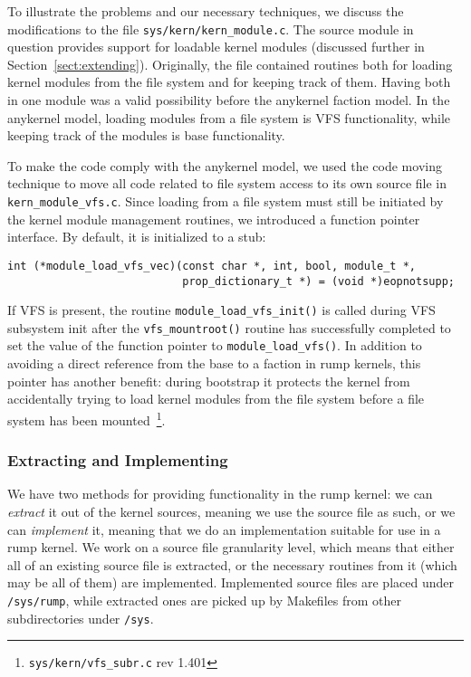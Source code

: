 To illustrate the problems and our necessary techniques, we discuss
the modifications to the file \verb+sys/kern/kern_module.c+.  The
source module in question provides support for loadable kernel
modules (discussed further in Section~\ref{sect:extending}).
Originally, the file contained routines both for loading kernel
modules from the file system and for keeping track of them.  Having
both in one module was a valid possibility before the anykernel faction
model.  In the anykernel model, loading modules from a file system is VFS
functionality, while keeping track of the modules is base functionality.

To make the code comply with the anykernel model, we used the code
moving technique to move all code related to file system access to
its own source file in \verb+kern_module_vfs.c+.  Since loading from
a file system must still be initiated by the kernel module management
routines, we introduced a function pointer interface.  By default,
it is initialized to a stub:

{\small
\begin{verbatim}
int (*module_load_vfs_vec)(const char *, int, bool, module_t *,
                           prop_dictionary_t *) = (void *)eopnotsupp; 
\end{verbatim}}

If VFS is present, the routine \verb+module_load_vfs_init()+ is
called during VFS subsystem init after the \verb+vfs_mountroot()+
routine has successfully completed to set the value of the function
pointer to \verb+module_load_vfs()+.  In addition to avoiding a
direct reference from the base to a faction in rump kernels, this
pointer has another benefit: during bootstrap it protects the kernel from
accidentally trying to load kernel modules from the file system before
a file system has been mounted~\footnote{\texttt{sys/kern/vfs\_subr.c}
rev 1.401}.

\subsubsection{Extracting and Implementing}

We have two methods for providing functionality in the rump kernel:
we can \textit{extract} it out of the kernel sources, meaning we
use the source file as such, or we can \textit{implement}
it, meaning that we do an implementation suitable for use in a rump
kernel.  We work on a source file granularity level, which means
that either all of an existing source file is extracted, or the
necessary routines from it (which may be all of them) are implemented.
Implemented source files are placed under \texttt{/sys/rump},
while extracted ones are picked up by Makefiles from other subdirectories
under \texttt{/sys}.

